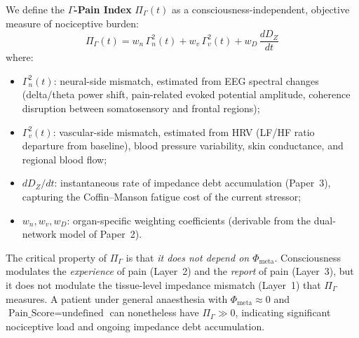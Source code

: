 \documentclass[aps,pre,twocolumn,superscriptaddress,floatfix]{revtex4-2}
\begin{document}
We define the \textbf{$\Gamma$-Pain Index}
$\Pi_{\Gamma}(t)$ as a consciousness-independent,
objective measure of nociceptive burden:
\begin{equation}
  \boxed{\;
  \Pi_{\Gamma}(t) =
    w_n\,\Gamma_n^2(t) + w_v\,\Gamma_v^2(t)
    + w_D\,\frac{dD_Z}{dt}\;
  }
  \label{eq:gamma-pain-index}
\end{equation}
where:
\begin{itemize}
  \item $\Gamma_n^2(t)$: neural-side mismatch, estimated
    from EEG spectral changes (delta/theta power shift,
    pain-related evoked potential amplitude, coherence
    disruption between somatosensory and frontal regions);
  \item $\Gamma_v^2(t)$: vascular-side mismatch, estimated
    from HRV (LF/HF ratio departure from baseline),
    blood pressure variability, skin conductance, and
    regional blood flow;
  \item $dD_Z/dt$: instantaneous rate of impedance debt
    accumulation (Paper~3), capturing the
    Coffin--Manson fatigue cost of the current stressor;
  \item $w_n, w_v, w_D$: organ-specific weighting
    coefficients (derivable from the dual-network model
    of Paper~2).
\end{itemize}

The critical property of $\Pi_{\Gamma}$ is that
\emph{it does not depend on $\Phi_{\text{meta}}$}.
Consciousness modulates the \emph{experience} of pain
(Layer~2) and the \emph{report} of pain (Layer~3), but
it does not modulate the tissue-level impedance mismatch
(Layer~1) that $\Pi_{\Gamma}$ measures.
A patient under general anaesthesia with
$\Phi_{\text{meta}}\approx 0$ and
$\text{Pain\_Score}=\text{undefined}$ can nonetheless
have $\Pi_{\Gamma}\gg 0$, indicating significant
nociceptive load and ongoing impedance debt accumulation.
\end{document}
